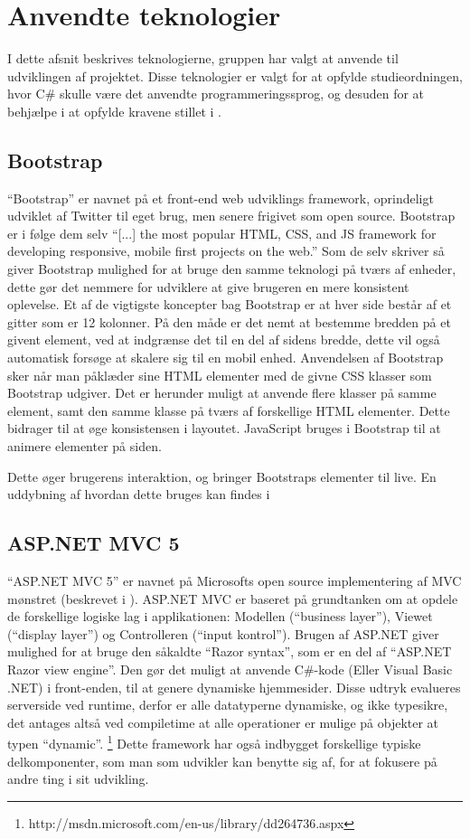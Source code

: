 \section{Anvendte teknologier}
I dette afsnit beskrives teknologierne, gruppen har valgt at anvende til udviklingen af projektet.
Disse teknologier er valgt for at opfylde studieordningen, hvor C\# skulle være det anvendte programmeringssprog, og desuden for at behjælpe i at opfylde kravene stillet i .

\subsection{Bootstrap}
``Bootstrap'' er navnet på et front-end web udviklings framework, oprindeligt udviklet af Twitter til eget brug, men senere frigivet som open source.
Bootstrap er i følge dem selv ``[...] the most popular HTML, CSS, and JS framework for developing responsive, mobile first projects on the web.'' \cite{GETBOOTSTRAP}
Som de selv skriver så giver Bootstrap mulighed for at bruge den samme teknologi på tværs af enheder, dette gør det nemmere for udviklere at give brugeren en mere konsistent oplevelse.
Et af de vigtigste koncepter bag Bootstrap er at hver side består af et gitter som er 12 kolonner.
På den måde er det nemt at bestemme bredden på et givent element, ved at indgrænse det til en del af sidens bredde, dette vil også automatisk forsøge at skalere sig til en mobil enhed.
Anvendelsen af Bootstrap sker når man påklæder sine HTML elementer med de givne CSS klasser som Bootstrap udgiver.
Det er herunder muligt at anvende flere klasser på samme element, samt den samme klasse på tværs af forskellige HTML elementer.
Dette bidrager til at øge konsistensen i layoutet.
JavaScript bruges i Bootstrap til at animere elementer på siden.

Dette øger brugerens interaktion, og bringer Bootstraps elementer til live.
En uddybning af hvordan dette bruges kan findes i  \cite{GETBOOTSTRAP}

\subsection{ASP.NET MVC 5}\label{aspnet}
``ASP.NET MVC 5'' er navnet på Microsofts open source implementering af MVC mønstret (beskrevet i ).
ASP.NET MVC er baseret på grundtanken om at opdele de forskellige logiske lag i applikationen: Modellen (``business layer''), Viewet (``display layer'') og Controlleren (``input kontrol'').
Brugen af ASP.NET giver mulighed for at bruge den såkaldte ``Razor syntax'', som er en del af ``ASP.NET Razor view engine''.
Den gør det muligt at anvende C\#-kode (Eller Visual Basic .NET) i front-enden, til at genere dynamiske hjemmesider.
Disse udtryk evalueres serverside ved runtime, derfor er alle datatyperne dynamiske, og ikke typesikre, det antages altså ved compiletime at alle operationer er mulige på objekter at typen ``dynamic''. \footnote{http://msdn.microsoft.com/en-us/library/dd264736.aspx}
Dette framework har også indbygget forskellige typiske delkomponenter, som man som udvikler kan benytte sig af, for at fokusere på andre ting i sit udvikling.

